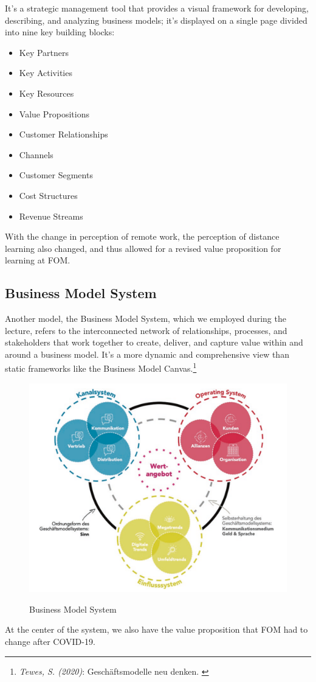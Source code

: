 It's a strategic management tool that provides a visual framework for developing, describing, and analyzing business models; it's displayed on a single page divided into nine key building blocks:

\begin{itemize}
    \item Key Partners
    \item Key Activities
    \item Key Resources
    \item Value Propositions
    \item Customer Relationships
    \item Channels
    \item Customer Segments
    \item Cost Structures
    \item Revenue Streams
\end{itemize}

With the change in perception of remote work, the perception of distance learning also changed, and thus allowed for a revised value proposition for learning at FOM.

\subsection{Business Model System}

Another model, the Business Model System, which we employed during the lecture, refers to the interconnected network of relationships, processes, and stakeholders that work together to create, deliver, and capture value within and around a business model. It's a more dynamic and comprehensive view than static frameworks like the Business Model Canvas.\footnote{\textit{Tewes, S. (2020)}: Geschäftsmodelle neu denken. \cite{zukunft}} 

\begin{figure}[H]
\centering
\caption {Business Model System}
\includegraphics[width=\linewidth]{images/business-model-system.png}
\label{fig:businessModelSystem}
\end{figure}

At the center of the system, we also have the value proposition that FOM had to change after COVID-19.
